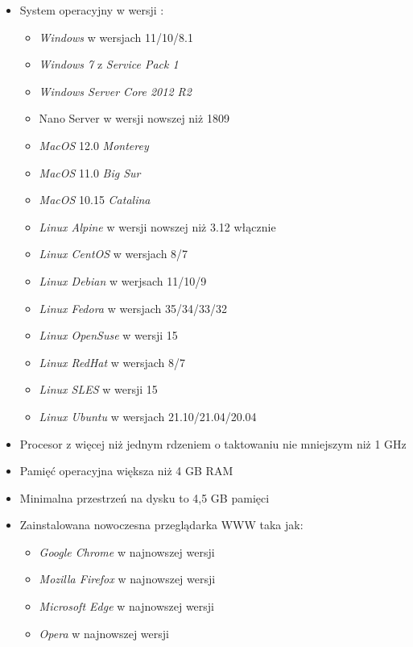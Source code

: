 \documentclass[a4paper,twoside,12pt]{book}
\begin{document}
	\begin{itemize}
		\item System operacyjny w wersji \cite{bib:requirementsWin}\cite{bib:requirementsMac}\cite{bib:requirementsLinux}\cite{bib:requirementsMongo}\cite{bib:requirementsFramework}:
		\begin {itemize}
			\item \textit{Windows} w wersjach 11/10/8.1
			\item \textit{Windows 7} z \textit{Service Pack 1}
			\item \textit{Windows Server Core 2012 R2}
			\item Nano Server w wersji nowszej niż 1809
			\item \textit{MacOS} 12.0 \textit{Monterey}
			\item \textit{MacOS} 11.0 \textit{Big Sur}
			\item \textit{MacOS} 10.15 \textit{Catalina}
			\item \textit{Linux Alpine} w wersji nowszej niż 3.12 włącznie
			\item \textit{Linux CentOS} w wersjach 8/7
			\item \textit{Linux Debian} w werjsach 11/10/9
			\item \textit{Linux Fedora} w wersjach 35/34/33/32
			\item \textit{Linux OpenSuse} w wersji 15
			\item \textit{Linux RedHat} w wersjach 8/7
			\item \textit{Linux SLES} w wersji 15
			\item \textit{Linux Ubuntu} w wersjach 21.10/21.04/20.04
		\end {itemize}	
		\item Procesor z więcej niż jednym rdzeniem o taktowaniu nie mniejszym niż 1 GHz
		\item Pamięć operacyjna większa niż 4 GB RAM
		\item Minimalna przestrzeń na dysku to 4,5 GB pamięci
		\item Zainstalowana nowoczesna przeglądarka WWW taka jak:
		\begin{itemize}
			\item \textit{Google Chrome} w najnowszej wersji
			\item \textit{Mozilla Firefox} w najnowszej wersji
			\item \textit{Microsoft Edge} w najnowszej wersji
			\item \textit{Opera} w najnowszej wersji
		\end{itemize}
	\end{itemize}
\end{document}
